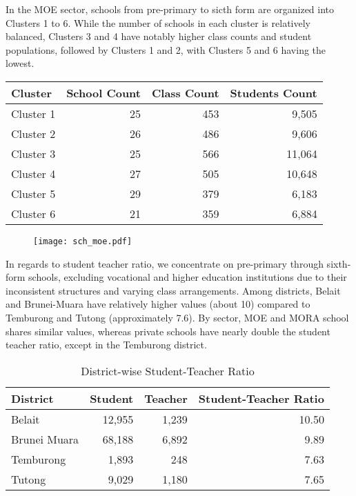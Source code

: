 \documentclass[12pt]{article}
\begin{document}
In the MOE sector, schools from pre-primary to sicth form are organized into Clusters 1 to 6. While the number of schools in each cluster is relatively balanced, Clusters 3 and 4 have notably higher class counts and student populations, followed by Clusters 1 and 2, with Clusters 5 and 6 having the lowest.

\begin{table}[htbp]
\centering
\setlength{\tabcolsep}{10pt}
\begin{tabular}{lrrr}
\hline
\textbf{Cluster} & \textbf{School Count} & \textbf{Class Count} & \textbf{Students Count} \\ 
\hline
Cluster 1        & 25                    & 453                  & 9,505                   \\
Cluster 2        & 26                    & 486                  & 9,606                   \\
Cluster 3        & 25                    & 566                  & 11,064                  \\
Cluster 4        & 27                    & 505                  & 10,648                  \\
Cluster 5        & 29                    & 379                  & 6,183                   \\
Cluster 6        & 21                    & 359                  & 6,884                   \\
\hline
\end{tabular}
\end{table}

\begin{figure}[htbp]
\centering
\texttt{[image: sch\_moe.pdf]}
\end{figure} 

In regards to student teacher ratio, we concentrate on pre-primary through sixth-form schools, excluding vocational and higher education institutions due to their inconsistent structures and varying class arrangements. Among districts, Belait and Brunei-Muara have relatively higher values (about 10) compared to Temburong and Tutong (approximately 7.6). By sector, MOE and MORA school shares similar values, whereas private schools have nearly double the student teacher ratio, except in the Temburong district. 

\begin{table}[htbp]
\centering
\setlength{\tabcolsep}{10pt}
\begin{tabular}{lrrr}
\hline
\textbf{District}   & \textbf{Student}  & \textbf{Teacher}  & \textbf{Student-Teacher Ratio} \\ 
\hline
Belait              & 12,955            & 1,239             & 10.50 \\
Brunei Muara        & 68,188            & 6,892             & 9.89 \\
Temburong           & 1,893             & 248               & 7.63 \\
Tutong              & 9,029             & 1,180             & 7.65 \\ 
\hline
\end{tabular}
\caption{District-wise Student-Teacher Ratio}
\end{table}
\end{document}
